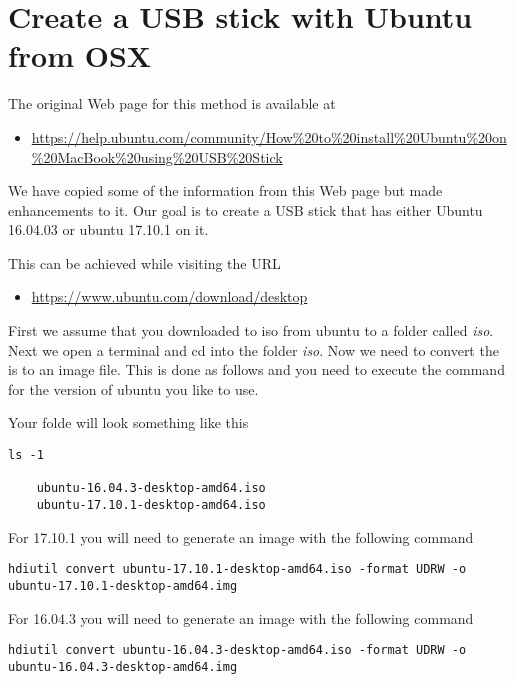\MDNAME
\section{Create a USB stick with Ubuntu from OSX}

The original Web page for this method is available at

\begin{itemize}
\item
  \url{https://help.ubuntu.com/community/How\%20to\%20install\%20Ubuntu\%20on\%20MacBook\%20using\%20USB\%20Stick}
\end{itemize}

We have copied some of the information from this Web page but made
enhancements to it. Our goal is to create a USB stick that has either
Ubuntu 16.04.03 or ubuntu 17.10.1 on it.

This can be achieved while visiting the URL

\begin{itemize}
\item
  \url{https://www.ubuntu.com/download/desktop}
\end{itemize}

First we assume that you downloaded to iso from ubuntu to a folder
called \emph{iso}. Next we open a terminal and cd into the folder
\emph{iso}. Now we need to convert the is to an image file. This is done
as follows and you need to execute the command for the version of ubuntu
you like to use.

Your folde will look something like this

\begin{lstlisting}
ls -1

    ubuntu-16.04.3-desktop-amd64.iso
    ubuntu-17.10.1-desktop-amd64.iso
\end{lstlisting}

For 17.10.1 you will need to generate an image with the following
command

\begin{lstlisting}
hdiutil convert ubuntu-17.10.1-desktop-amd64.iso -format UDRW -o ubuntu-17.10.1-desktop-amd64.img
\end{lstlisting}

For 16.04.3 you will need to generate an image with the following
command

\begin{lstlisting}
hdiutil convert ubuntu-16.04.3-desktop-amd64.iso -format UDRW -o ubuntu-16.04.3-desktop-amd64.img
\end{lstlisting}

